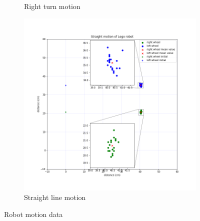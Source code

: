 \documentclass[11pt,a4paper,openright,twoside]{extreport}
\begin{document}
\begin{itemize}
\begin{figure}[H]
\begin{subfigure}[b]{0.49\textwidth}
\caption{Right turn motion}
\label{right}
\end{subfigure}
\begin{subfigure}[b]{0.49\textwidth}
\includegraphics[width=\textwidth]{Straight.png}
\caption{Straight line motion}
\label{straight}
\end{subfigure}
\caption{Robot motion data}
\label{data}
\end{figure}


\end{itemize}
\end{document}
